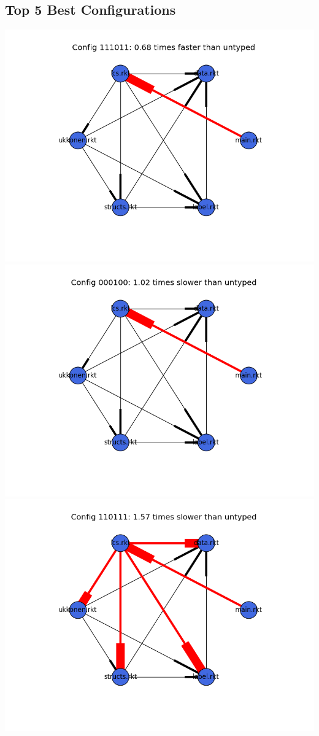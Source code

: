 \documentclass{article}
\begin{document}
\begin{itemize}
\subsection{Top 5 Best Configurations}
\includegraphics[width=\textwidth]{suffixtree-2015-04-02-module-graph-111011.png}
\includegraphics[width=\textwidth]{suffixtree-2015-04-02-module-graph-000100.png}
\includegraphics[width=\textwidth]{suffixtree-2015-04-02-module-graph-110111.png}

\end{itemize}
\end{document}
